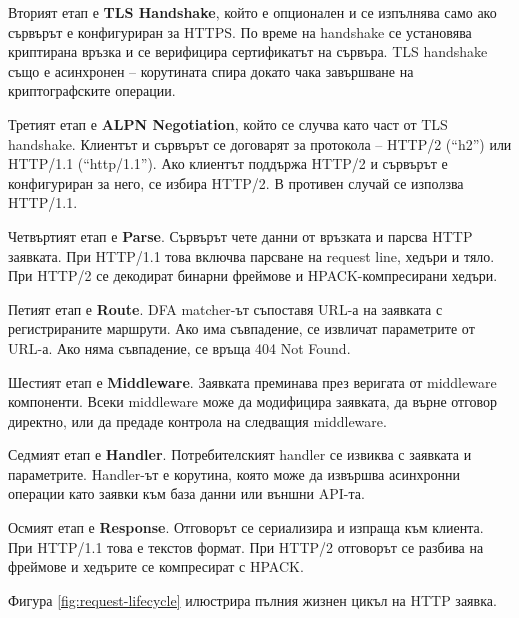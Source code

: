 Вторият етап е \textbf{TLS Handshake}, който е опционален и се изпълнява само ако сървърът е конфигуриран за HTTPS. По време на handshake се установява криптирана връзка и се верифицира сертификатът на сървъра. TLS handshake също е асинхронен -- корутината спира докато чака завършване на криптографските операции.

Третият етап е \textbf{ALPN Negotiation}, който се случва като част от TLS handshake. Клиентът и сървърът се договарят за протокола -- HTTP/2 (``h2'') или HTTP/1.1 (``http/1.1''). Ако клиентът поддържа HTTP/2 и сървърът е конфигуриран за него, се избира HTTP/2. В противен случай се използва HTTP/1.1.

Четвъртият етап е \textbf{Parse}. Сървърът чете данни от връзката и парсва HTTP заявката. При HTTP/1.1 това включва парсване на request line, хедъри и тяло. При HTTP/2 се декодират бинарни фреймове и HPACK-компресирани хедъри.

Петият етап е \textbf{Route}. DFA matcher-ът съпоставя URL-а на заявката с регистрираните маршрути. Ако има съвпадение, се извличат параметрите от URL-а. Ако няма съвпадение, се връща 404 Not Found.

Шестият етап е \textbf{Middleware}. Заявката преминава през веригата от middleware компоненти. Всеки middleware може да модифицира заявката, да върне отговор директно, или да предаде контрола на следващия middleware.

Седмият етап е \textbf{Handler}. Потребителският handler се извиква с заявката и параметрите. Handler-ът е корутина, която може да извършва асинхронни операции като заявки към база данни или външни API-та.

Осмият етап е \textbf{Response}. Отговорът се сериализира и изпраща към клиента. При HTTP/1.1 това е текстов формат. При HTTP/2 отговорът се разбива на фреймове и хедърите се компресират с HPACK.

Фигура \ref{fig:request-lifecycle} илюстрира пълния жизнен цикъл на HTTP заявка.

